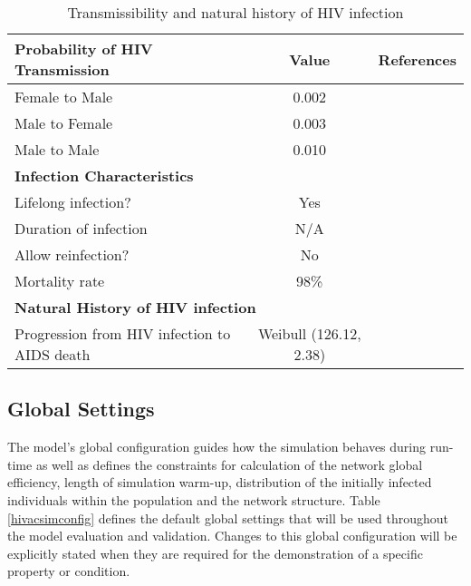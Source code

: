 \begin{longtable}[c]{|p{8cm}|c|c|}
\caption{Transmissibility and natural history of HIV infection}\\\hline
\label{hivdefinition}
\textbf{Probability of HIV Transmission}     & \textbf{Value} & \textbf{References}  \\\hline
Female to Male                               & 0.002 &  \cite{Donovan2000,Royce1997} \\\hline
Male to Female                               & 0.003 &  \cite{Donovan2000,Royce1997} \\\hline
Male to Male                                 & 0.010 &  \cite{Donovan2000,Royce1997} \\\hline
\multicolumn{3}{|l|}{\textbf{Infection Characteristics}}\\\hline
Lifelong infection?                          & Yes   &  \\\hline
Duration of infection                        & N/A   &  \\\hline
Allow reinfection?                           & No    &  \\\hline
Mortality rate                               & 98\%  & \cite{UNAIDSRG2002} \\\hline
\multicolumn{3}{|l|}{\textbf{Natural History of HIV infection}}\\\hline
Progression from HIV infection to AIDS death & Weibull (126.12, 2.38) & \cite{UNAIDSRG2002} \\\hline
\end{longtable}


\subsection{Global Settings}\label{globalsettings}

The model's global configuration guides how the simulation behaves during run-time as
well as defines the constraints for calculation of the network global efficiency, length
of simulation warm-up, distribution of the initially infected individuals within the
population and the network structure. Table \ref{hivacsimconfig} defines the default global settings that
will be used throughout the model evaluation and validation. Changes to this global
configuration will be explicitly stated when they are required for the demonstration of a
specific property or condition.

